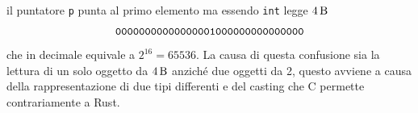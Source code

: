 \documentclass[Lau,binding=0.6cm]{sapthesis}
\newcommand{\textcode}[1]{\colorbox{backcolour}{\texttt{#1}}}
\begin{document}
il puntatore \texttt{p} punta al primo elemento ma essendo \textcode{int} legge $ \SI{4}{\byte} $  
\[
\texttt{00000000000000001000000000000000} \\
\]
che in decimale equivale a $ 2^{16} = 65536 $. La causa di questa confusione sia la lettura di un solo oggetto da $\SI{4}{\byte} $ anziché due oggetti da 2, questo avviene a causa della rappresentazione di due tipi differenti e del casting che C permette contrariamente a Rust.




%
%
\end{document}
